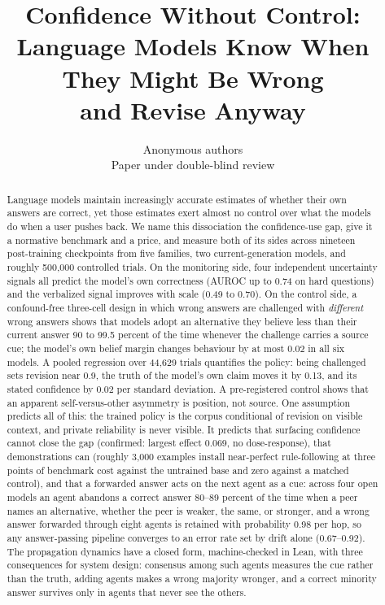 \documentclass{article}
\title{Confidence Without Control:\\Language Models Know When They Might Be Wrong\\and Revise Anyway}
\author{Anonymous authors\\Paper under double-blind review}
\begin{document}
\maketitle

\begin{abstract}
Language models maintain increasingly accurate estimates of whether their own answers are correct, yet those estimates exert almost no control over what the models do when a user pushes back. We name this dissociation the confidence-use gap, give it a normative benchmark and a price, and measure both of its sides across nineteen post-training checkpoints from five families, two current-generation models, and roughly 500{,}000 controlled trials. On the monitoring side, four independent uncertainty signals all predict the model's own correctness (AUROC up to 0.74 on hard questions) and the verbalized signal improves with scale (0.49 to 0.70). On the control side, a confound-free three-cell design in which wrong answers are challenged with \emph{different} wrong answers shows that models adopt an alternative they believe less than their current answer 90 to 99.5 percent of the time whenever the challenge carries a source cue; the model's own belief margin changes behaviour by at most 0.02 in all six models. A pooled regression over 44{,}629 trials quantifies the policy: being challenged sets revision near 0.9, the truth of the model's own claim moves it by 0.13, and its stated confidence by 0.02 per standard deviation. A pre-registered control shows that an apparent self-versus-other asymmetry is position, not source. One assumption predicts all of this: the trained policy is the corpus conditional of revision on visible context, and private reliability is never visible. It predicts that surfacing confidence cannot close the gap (confirmed: largest effect 0.069, no dose-response), that demonstrations can (roughly 3{,}000 examples install near-perfect rule-following at three points of benchmark cost against the untrained base and zero against a matched control), and that a forwarded answer acts on the next agent as a cue: across four open models an agent abandons a correct answer 80--89 percent of the time when a peer names an alternative, whether the peer is weaker, the same, or stronger, and a wrong answer forwarded through eight agents is retained with probability 0.98 per hop, so any answer-passing pipeline converges to an error rate set by drift alone (0.67--0.92). The propagation dynamics have a closed form, machine-checked in Lean, with three consequences for system design: consensus among such agents measures the cue rather than the truth, adding agents makes a wrong majority wronger, and a correct minority answer survives only in agents that never see the others.
\end{abstract}
\end{document}
